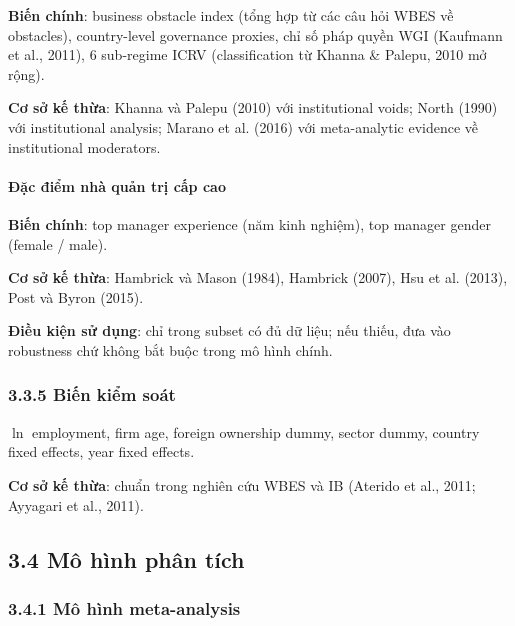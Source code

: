 \documentclass[12pt,a4paper]{article}
\begin{document}
\textbf{Biến chính}: business obstacle index (tổng hợp từ các câu hỏi
WBES về obstacles), country-level governance proxies, chỉ số pháp quyền
WGI (Kaufmann et al., 2011), 6 sub-regime ICRV (classification từ Khanna
\& Palepu, 2010 mở rộng).

\textbf{Cơ sở kế thừa}: Khanna và Palepu (2010) với institutional voids;
North (1990) với institutional analysis; Marano et al. (2016) với
meta-analytic evidence về institutional moderators.

\hypertarget{ux111ux1eb7c-ux111iux1ec3m-nhuxe0-quux1ea3n-trux1ecb-cux1ea5p-cao}{%
\paragraph{Đặc điểm nhà quản trị cấp
cao}\label{ux111ux1eb7c-ux111iux1ec3m-nhuxe0-quux1ea3n-trux1ecb-cux1ea5p-cao}}

\textbf{Biến chính}: top manager experience (năm kinh nghiệm), top
manager gender (female / male).

\textbf{Cơ sở kế thừa}: Hambrick và Mason (1984), Hambrick (2007), Hsu
et al. (2013), Post và Byron (2015).

\textbf{Điều kiện sử dụng}: chỉ trong subset có đủ dữ liệu; nếu thiếu,
đưa vào robustness chứ không bắt buộc trong mô hình chính.

\hypertarget{335-biux1ebfn-kiux1ec3m-souxe1t}{%
\subsubsection{3.3.5 Biến kiểm
soát}\label{335-biux1ebfn-kiux1ec3m-souxe1t}}

\(\ln\) employment, firm age, foreign ownership dummy, sector dummy,
country fixed effects, year fixed effects.

\textbf{Cơ sở kế thừa}: chuẩn trong nghiên cứu WBES và IB (Aterido et
al., 2011; Ayyagari et al., 2011).

\hypertarget{34-muxf4-huxecnh-phuxe2n-tuxedch}{%
\subsection{3.4 Mô hình phân
tích}\label{34-muxf4-huxecnh-phuxe2n-tuxedch}}

\hypertarget{341-muxf4-huxecnh-meta-analysis}{%
\subsubsection{3.4.1 Mô hình
meta-analysis}\label{341-muxf4-huxecnh-meta-analysis}}
\end{document}
